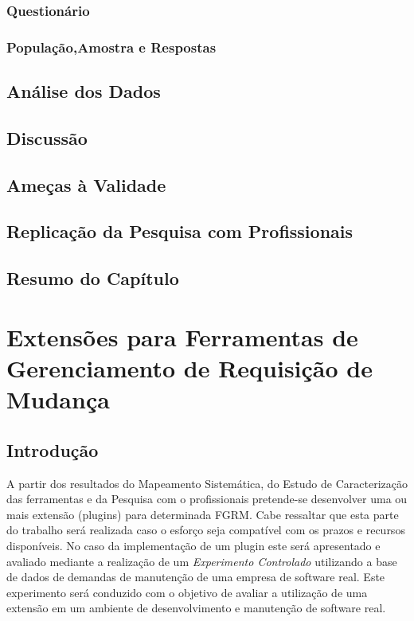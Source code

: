 \documentclass[msc]{ppgccufmg} %
\begin{document}
\subsection{Questionário}

\subsection{População,Amostra e Respostas}

\section{Análise dos Dados}

\section{Discussão}

\section{Ameças à Validade}

\section{Replicação da Pesquisa com Profissionais}

\section{Resumo do Capítulo}

\chapter{Extensões para Ferramentas de Gerenciamento de Requisição de Mudança}
\label{ch:extensoes}

\section{Introdução}
A partir dos resultados do Mapeamento Sistemática, do Estudo de Caracterização das ferramentas e da Pesquisa com o profissionais pretende-se desenvolver uma ou mais extensão (plugins) para determinada FGRM. Cabe ressaltar que esta parte do trabalho será realizada caso o esforço seja compatível com os prazos e recursos disponíveis. No caso da implementação de um plugin este será apresentado e avaliado mediante a realização de um \textit{Experimento Controlado} \cite{wohlin2012experimentation} utilizando a base de dados de demandas de manutenção de uma empresa de software real. Este experimento será conduzido com o objetivo de avaliar a utilização de uma extensão em um ambiente de desenvolvimento e manutenção de software real.
\end{document}

